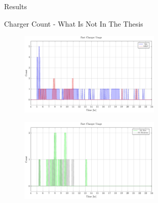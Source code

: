 \documentclass[aspectratio=169]{beamer}
\begin{document}
\begin{frame}[label={sec:org4ee59dd}]{Results}
\begin{frame}[label={sec:orgf6caf70}]{Charger Count - What Is Not In The Thesis}
\begin{figure}[htpb]
\centering
    \includegraphics[width=0.6\textwidth]{img/sa-pap-paper-good/charger-count-fast-milp-qin}
\end{figure}
\begin{figure}[htpb]
\centering
    \includegraphics[width=0.6\textwidth]{img/sa-pap-paper-good/charger-count-fast-sa}
\end{figure}
\end{frame}


\end{frame}
\end{document}

